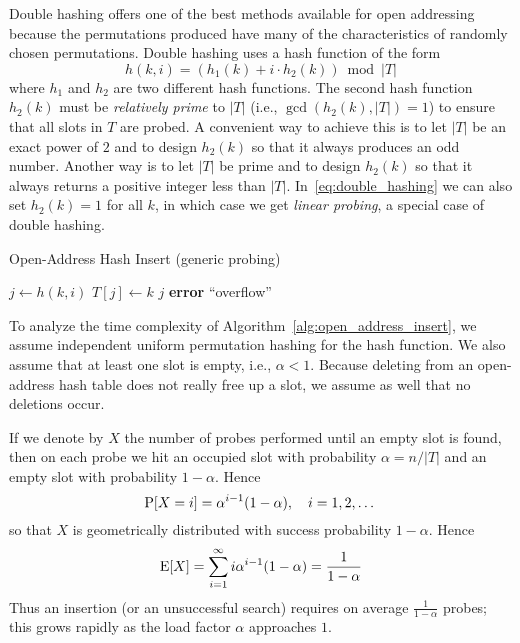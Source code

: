 \begin{example}
  \label{ex:double_hashing}
  Double hashing offers one of the best methods available for open addressing because the permutations produced have many of the characteristics of randomly chosen permutations. 
  Double hashing uses a hash function of the form
  \begin{equation}
    \label{eq:double_hashing}
  h(k,i) = (h_1(k) + i \cdot h_2(k)) \bmod |T|
  \end{equation}
  where \(h_1\) and \(h_2\) are two different hash functions.
  The second hash function \(h_2(k)\) must be \emph{relatively prime} to \(|T|\) (i.e., \(\gcd(h_2(k),|T|)=1\)) to ensure that all slots in \(T\) are probed.
  A convenient way to achieve this is to let \(|T|\) be an exact power of \(2\) and to design \(h_2(k)\) so that it always produces an odd number.
  Another way is to let \(|T|\) be prime and to design \(h_2(k)\) so that it always returns a positive integer less than \(|T|\).
  In~\eqref{eq:double_hashing} we can also set \(h_2(k) = 1\) for all \(k\), in which case we get \emph{linear probing}, a special case of double hashing.
\end{example}

\begin{algorithm}[htb]
  \caption{Open-Address Hash Insert (generic probing)}
  \label{alg:open_address_insert}
  \begin{algorithmic}[1]
        \State $j \gets h(k,i)$
          \State $T[j] \gets k$
          \State \Return $j$
        \EndIf
      \EndFor
      \State \textbf{error} ``overflow''
    \EndFunction
  \end{algorithmic}
\end{algorithm}

To analyze the time complexity of Algorithm~\ref{alg:open_address_insert}, we assume independent uniform permutation hashing for the hash function.
We also assume that at least one slot is empty, i.e., \(\alpha < 1\).
Because deleting from an open-address hash table does not really free up a slot, we assume as well that no deletions occur.

If we denote by \(X\) the number of probes performed until an empty slot is found, then on each probe we hit an occupied slot with probability \(\alpha = n/|T|\) and an empty slot with probability \(1-\alpha\).  
Hence
\[
\operatorname{P}[X=i]= \alpha^{i-1}(1-\alpha), \quad i=1,2,\dots
\]
so that \(X\) is geometrically distributed with success probability \(1-\alpha\).
Hence
\[
\operatorname{E}[X]=\sum_{i=1}^{\infty} i\alpha^{i-1}(1-\alpha)=\frac{1}{1-\alpha}
\]
Thus an insertion (or an unsuccessful search) requires on average \(\tfrac{1}{1-\alpha}\) probes; this grows rapidly as the load factor \(\alpha\) approaches \(1\).

